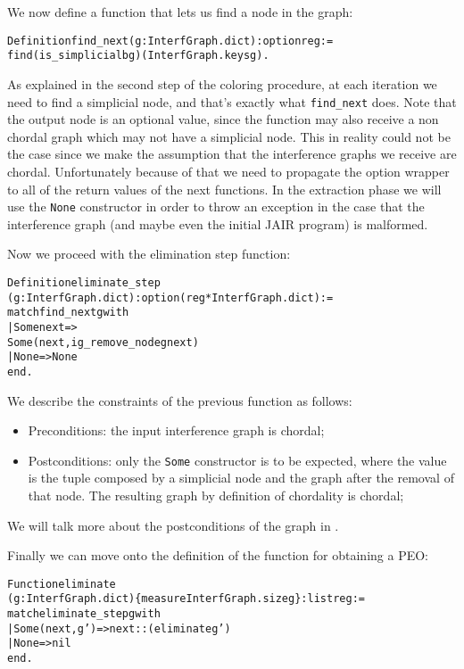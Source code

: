 We now define a function that lets us find a node in the graph:

\begin{alltt}
Definition find_next (g : InterfGraph.dict) : option reg :=
  find (is_simplicialb g) (InterfGraph.keys g).
\end{alltt}

As explained in the second step of the coloring procedure, at each iteration we need to find a simplicial node, and that's exactly what \texttt{find\_next} does. Note that the output node is an optional value, since the function may also receive a non chordal graph which may not have a simplicial node. This in reality could not be the case since we make the assumption that the interference graphs we receive are chordal. Unfortunately because of that we need to propagate the option wrapper to all of the return values of the next functions.
In the extraction phase we will use the \texttt{None} constructor in order to throw an exception in the case that the interference graph (and maybe even the initial JAIR program) is malformed.

Now we proceed with the elimination step function:

\begin{alltt}
Definition eliminate_step
  (g : InterfGraph.dict) : option (reg * InterfGraph.dict):=
  match find_next g with
  | Some next =>
    Some (next, ig_remove_node g next)
  | None => None
  end.
\end{alltt}

We describe the constraints of the previous function as follows:

\begin{itemize}
  \item Preconditions: the input interference graph is chordal;
  \item Postconditions: only the \texttt{Some} constructor is to be expected, where the value is the tuple composed by a simplicial node and the graph after the removal of that node. The resulting graph by definition of chordality is chordal;
\end{itemize}

We will talk more about the postconditions of the graph in .

Finally we can move onto the definition of the function for obtaining a PEO:

\begin{alltt}
Function eliminate
  (g : InterfGraph.dict) \{measure InterfGraph.size g\} : list reg :=
  match eliminate_step g with
  | Some (next, g') => next :: (eliminate g')
  | None => nil
  end.
\end{alltt}

